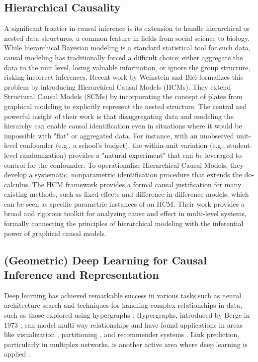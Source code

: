 {\subsection{Hierarchical Causality}
\label{subsec:hierarchical_causality}

A significant frontier in causal inference is its extension to handle hierarchical or nested data structures, a common feature in fields from social science to biology. While hierarchical Bayesian modeling is a standard statistical tool for such data, causal modeling has traditionally forced a difficult choice: either aggregate the data to the unit level, losing valuable information, or ignore the group structure, risking incorrect inferences.
Recent work by Weinstein and Blei\cite{weinstein2024hierarchical} formalizes this problem by introducing Hierarchical Causal Models (HCMs). They extend Structural Causal Models (SCMs) by incorporating the concept of plates from graphical modeling to explicitly represent the nested structure. The central and powerful insight of their work is that disaggregating data and modeling the hierarchy can enable causal identification even in situations where it would be impossible with "flat" or aggregated data. For instance, with an unobserved unit-level confounder (e.g., a school's budget), the within-unit variation (e.g., student-level randomization) provides a "natural experiment" that can be leveraged to control for the confounder.
To operationalize Hierarchical Causal Models, they develop a systematic, nonparametric identification procedure that extends the do-calculus. The HCM framework provides a formal causal justification for many existing methods, such as fixed-effects and difference-in-difference models, which can be seen as specific parametric instances of an HCM. Their work provides a broad and rigorous toolkit for analyzing cause and effect in multi-level systems, formally connecting the principles of hierarchical modeling with the inferential power of graphical causal models.

\subsection{(Geometric) Deep Learning for Causal Inference and Representation}
\label{subsec:geometric_dl_causality}

Deep learning has achieved remarkable success in various tasks,such as neural architecture search \cite{Baker2017aDesigning, Bender2018Understanding} and techniques for handling complex relationships in data, such as those explored using hypergraphs \cite{Ouvrard2020Hypergraphs, Berge1973Graphs}. Hypergraphs, introduced by Berge in 1973 \cite{Berge1973Graphs}, can model multi-way relationships and have found applications in areas like visualization \cite{Alsallakh2016State, Jacomy2014ForceAtlas2}, partitioning \cite{Catalyurek1999Hypergraph, Devine2006Parallel, Yang2017Hypergraph}, and recommender systems \cite{Zheng2018Novel, Zhou2007Learning, Wu2018Nonnegative, Jin2015Low, Zhu2015ContentBased, Zhu2016Heterogeneous}. Link prediction, particularly in multiplex networks, is another active area where deep learning is applied \cite{Potluru2020Deeplex, Zhang2018Link}.

}
